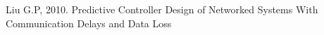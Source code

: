 \begin{thebibliography}{99}

 Liu G.P, 2010. Predictive Controller Design of Networked Systems With Communication Delays and Data Loss 










    
    
    
    
    

\end{thebibliography}

